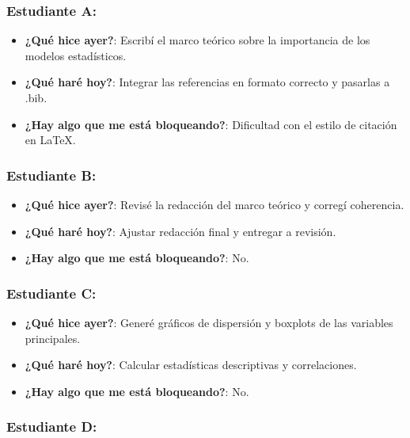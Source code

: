 \documentclass[
  11pt,
]{article}
\providecommand{\tightlist}{%
  \setlength{\itemsep}{0pt}\setlength{\parskip}{0pt}}
\begin{document}
\subsubsection{Estudiante A:}\label{estudiante-a}

\begin{itemize}
\tightlist
\item
  \textbf{¿Qué hice ayer?}: Escribí el marco teórico sobre la
  importancia de los modelos estadísticos.
\item
  \textbf{¿Qué haré hoy?}: Integrar las referencias en formato correcto
  y pasarlas a .bib.
\item
  \textbf{¿Hay algo que me está bloqueando?}: Dificultad con el estilo
  de citación en LaTeX.
\end{itemize}

\subsubsection{Estudiante B:}\label{estudiante-b}

\begin{itemize}
\tightlist
\item
  \textbf{¿Qué hice ayer?}: Revisé la redacción del marco teórico y
  corregí coherencia.
\item
  \textbf{¿Qué haré hoy?}: Ajustar redacción final y entregar a
  revisión.
\item
  \textbf{¿Hay algo que me está bloqueando?}: No.
\end{itemize}

\subsubsection{Estudiante C:}\label{estudiante-c}

\begin{itemize}
\tightlist
\item
  \textbf{¿Qué hice ayer?}: Generé gráficos de dispersión y boxplots de
  las variables principales.
\item
  \textbf{¿Qué haré hoy?}: Calcular estadísticas descriptivas y
  correlaciones.
\item
  \textbf{¿Hay algo que me está bloqueando?}: No.
\end{itemize}

\subsubsection{Estudiante D:}\label{estudiante-d}
\end{document}

